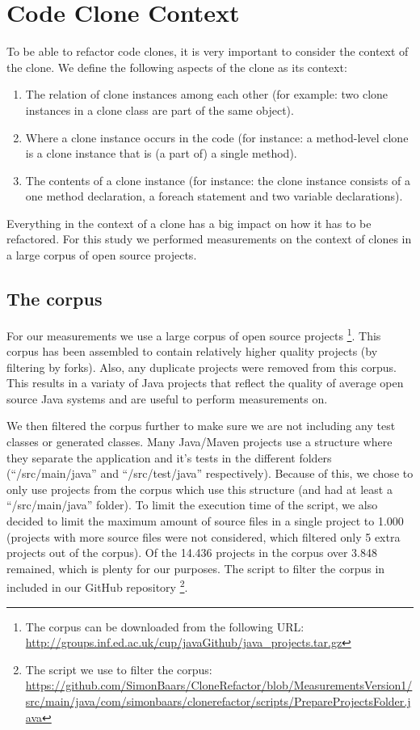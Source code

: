 \documentclass[a4paper]{article}
\begin{document}
\section{Code Clone Context}
To be able to refactor code clones, it is very important to consider the context of the clone. We define the following aspects of the clone as its context:
\begin{enumerate}
  \item The relation of clone instances among each other (for example: two clone instances in a clone class are part of the same object).
  \item Where a clone instance occurs in the code (for instance: a method-level clone is a clone instance that is (a part of) a single method).
  \item The contents of a clone instance (for instance: the clone instance consists of a one method declaration, a foreach statement and two variable declarations).
\end{enumerate}
Everything in the context of a clone has a big impact on how it has to be refactored. For this study we performed measurements on the context of clones in a large corpus of open source projects.

\subsection{The corpus}
For our measurements we use a large corpus of open source projects \cite{githubCorpus2013}\footnote{The corpus can be downloaded from the following URL: \url{http://groups.inf.ed.ac.uk/cup/javaGithub/java_projects.tar.gz}}. This corpus has been assembled to contain relatively higher quality projects (by filtering by forks). Also, any duplicate projects were removed from this corpus. This results in a variaty of Java projects that reflect the quality of average open source Java systems and are useful to perform measurements on.

We then filtered the corpus further to make sure we are not including any test classes or generated classes. Many Java/Maven projects use a structure where they separate the application and it's tests in the different folders (``/src/main/java'' and ``/src/test/java'' respectively). Because of this, we chose to only use projects from the corpus which use this structure (and had at least a ``/src/main/java'' folder). To limit the execution time of the script, we also decided to limit the maximum amount of source files in a single project to 1.000 (projects with more source files were not considered, which filtered only 5 extra projects out of the corpus). Of the 14.436 projects in the corpus over 3.848 remained, which is plenty for our purposes. The script to filter the corpus in included in our GitHub repository \footnote{The script we use to filter the corpus: \url{https://github.com/SimonBaars/CloneRefactor/blob/MeasurementsVersion1/src/main/java/com/simonbaars/clonerefactor/scripts/PrepareProjectsFolder.java}}.
\end{document}
